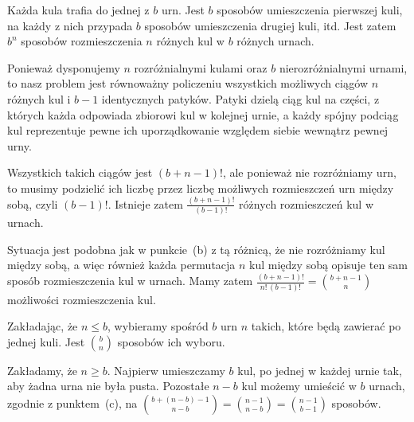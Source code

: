 \problems


\subproblem %
Każda kula trafia do jednej z $b$ urn. Jest $b$ sposobów umieszczenia pierwszej kuli, na każdy z nich przypada $b$ sposobów umieszczenia drugiej kuli, itd. Jest zatem $b^n$ sposobów rozmieszczenia $n$ różnych kul w $b$ różnych urnach.

\subproblem %
Ponieważ dysponujemy $n$ rozróżnialnymi kulami oraz $b$ nierozróżnialnymi urnami, to nasz problem jest równoważny policzeniu wszystkich możliwych ciągów $n$ różnych kul i $b-1$ identycznych patyków. Patyki dzielą ciąg kul na części, z których każda odpowiada zbiorowi kul w kolejnej urnie, a każdy spójny podciąg kul reprezentuje pewne ich uporządkowanie względem siebie wewnątrz pewnej urny.

Wszystkich takich ciągów jest $(b+n-1)!$, ale ponieważ nie rozróżniamy urn, to musimy podzielić ich liczbę przez liczbę możliwych rozmieszczeń urn między sobą, czyli $(b-1)!$. Istnieje zatem $\frac{(b+n-1)!}{(b-1)!}$ różnych rozmieszczeń kul w urnach.

\subproblem %
Sytuacja jest podobna jak w punkcie~(b) z tą różnicą, że nie rozróżniamy kul między sobą, a więc również każda permutacja $n$ kul między sobą opisuje ten sam sposób rozmieszczenia kul w urnach. Mamy zatem $\frac{(b+n-1)!}{n!\,(b-1)!}=\binom{b+n-1}{n}$ możliwości rozmieszczenia kul.

\subproblem %
Zakładając, że $n\le b$, wybieramy spośród $b$ urn $n$ takich, które będą zawierać po jednej kuli. Jest $\binom{b}{n}$ sposobów ich wyboru.

\subproblem %
Zakładamy, że $n\ge b$. Najpierw umieszczamy $b$ kul, po jednej w każdej urnie tak, aby żadna urna nie była pusta. Pozostałe $n-b$ kul możemy umieścić w $b$ urnach, zgodnie z punktem~(c), na $\binom{b+(n-b)-1}{n-b}=\binom{n-1}{n-b}=\binom{n-1}{b-1}$ sposobów.

\endinput
